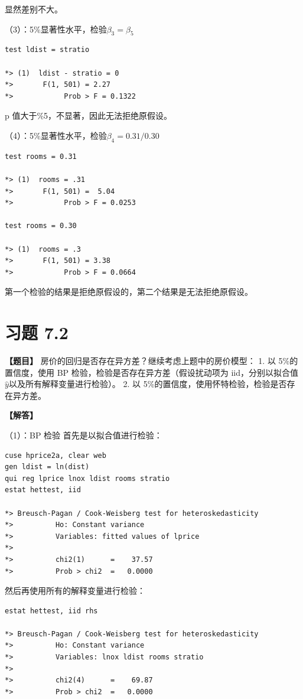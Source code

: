 \documentclass[cn,fancy,blue,11pt]{elegantbook}
\begin{document}
显然差别不大。

（3）：5\%显著性水平，检验\(\beta_3 = \beta_5\)

\begin{lstlisting}
test ldist = stratio

*> (1)  ldist - stratio = 0
*>       F(1, 501) = 2.27
*>            Prob > F = 0.1322
\end{lstlisting}

p 值大于\%5，不显著，因此无法拒绝原假设。

（4）：5\%显著性水平，检验\(\beta_4 = 0.31 / 0.30\)

\begin{lstlisting}
test rooms = 0.31

*> (1)  rooms = .31
*>       F(1, 501) =  5.04
*>            Prob > F = 0.0253

test rooms = 0.30

*> (1)  rooms = .3
*>       F(1, 501) = 3.38
*>            Prob > F = 0.0664
\end{lstlisting}

第一个检验的结果是拒绝原假设的，第二个结果是无法拒绝原假设。


\hypertarget{section-46}{%
\section{习题 7.2}\label{section-46}}

\textbf{【题目】}
房价的回归是否存在异方差？继续考虑上题中的房价模型：
1. 以 5\%的置信度，使用 BP 检验，检验是否存在异方差（假设扰动项为 iid，分别以拟合值\(\hat{y}以及所有解释变量进行检验\)）。
2. 以 5\%的置信度，使用怀特检验，检验是否存在异方差。

\textbf{【解答】}

（1）：BP 检验
首先是以拟合值进行检验：

\begin{lstlisting}
cuse hprice2a, clear web
gen ldist = ln(dist)
qui reg lprice lnox ldist rooms stratio
estat hettest, iid

*> Breusch-Pagan / Cook-Weisberg test for heteroskedasticity
*>          Ho: Constant variance
*>          Variables: fitted values of lprice
*>
*>          chi2(1)      =    37.57
*>          Prob > chi2  =   0.0000
\end{lstlisting}

然后再使用所有的解释变量进行检验：

\begin{lstlisting}
estat hettest, iid rhs

*> Breusch-Pagan / Cook-Weisberg test for heteroskedasticity
*>          Ho: Constant variance
*>          Variables: lnox ldist rooms stratio
*>
*>          chi2(4)      =    69.87
*>          Prob > chi2  =   0.0000
\end{lstlisting}
\end{document}
